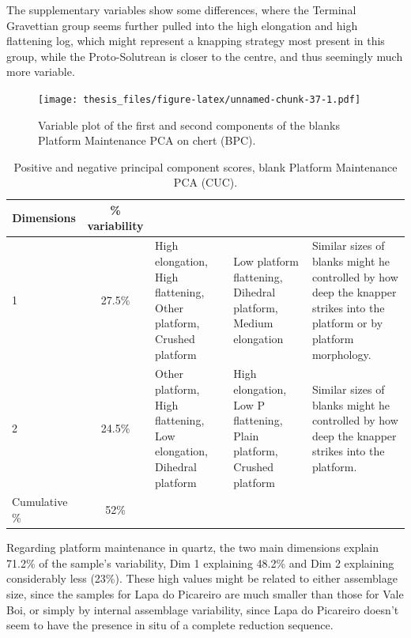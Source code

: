 \documentclass[12pt,twoside]{reedthesis}
\begin{document}
The supplementary variables show some differences, where the Terminal Gravettian group seems further pulled into the high elongation and high flattening log, which might represent a knapping strategy most present in this group, while the Proto-Solutrean is closer to the centre, and thus seemingly much more variable.
\begin{figure}
\centering
\texttt{[image: thesis\_files/figure-latex/unnamed-chunk-37-1.pdf]}
\caption{\label{fig:unnamed-chunk-37}Variable plot of the first and second components of the blanks Platform Maintenance PCA on chert (BPC).}
\end{figure}
\begin{table}

\caption{\label{tab:unnamed-chunk-38}Positive and negative principal component scores, blank Platform Maintenance PCA (CUC).}
\centering
\begin{tabular}[t]{lc>{\raggedright\arraybackslash}p{3cm}>{\raggedright\arraybackslash}p{3cm}>{\raggedright\arraybackslash}p{3cm}}
\toprule
\multicolumn{1}{c}{\textbf{Dimensions}} & \multicolumn{1}{c}{\textbf{\% variability}} & \multicolumn{1}{>{\centering\arraybackslash}p{3cm}}{\textbf{+}} & \multicolumn{1}{>{\centering\arraybackslash}p{3cm}}{\textbf{-}} & \multicolumn{1}{>{\centering\arraybackslash}p{3cm}}{\textbf{Interpretation}}\\
\midrule
1 & 27.5\% & High elongation, High flattening, Other platform, Crushed platform & Low platform flattening, Dihedral platform, Medium elongation & Similar sizes of blanks might he controlled by how deep the knapper strikes into the platform or by platform morphology.\\
2 & 24.5\% & Other platform, High flattening, Low elongation, Dihedral platform & High elongation, Low P flattening, Plain platform, Crushed platform & Similar sizes of blanks might he controlled by how deep the knapper strikes into the platform.\\
Cumulative \% & 52\% &  &  & \\
\bottomrule
\end{tabular}
\end{table}
Regarding platform maintenance in quartz, the two main dimensions explain 71.2\% of the sample's variability, Dim 1 explaining 48.2\% and Dim 2 explaining considerably less (23\%). These high values might be related to either assemblage size, since the samples for Lapa do Picareiro are much smaller than those for Vale Boi, or simply by internal assemblage variability, since Lapa do Picareiro doesn't seem to have the presence in situ of a complete reduction sequence.
\end{document}
